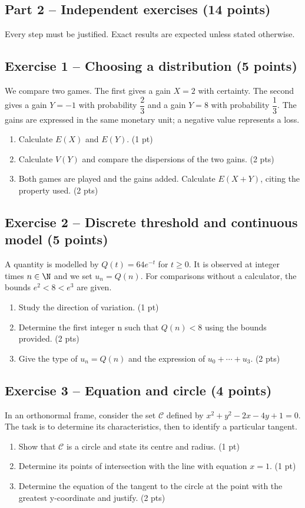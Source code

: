\clearpage\subsection*{Part 2 -- Independent exercises (14 points)}
Every step must be justified. Exact results are expected unless stated otherwise.
\subsection*{Exercise 1 -- Choosing a distribution (5 points)}
We compare two games. The first gives a gain $X=2$ with certainty. The second gives a gain $Y=-1$ with probability $\dfrac23$ and a gain $Y=8$ with probability $\dfrac13$. The gains are expressed in the same monetary unit; a negative value represents a loss.
\begin{enumerate}
\item Calculate $E(X)$ and $E(Y)$. \hfill(1 pt)
\item Calculate $V(Y)$ and compare the dispersions of the two gains. \hfill(2 pts)
\item Both games are played and the gains added. Calculate $E(X+Y)$, citing the property used. \hfill(2 pts)
\end{enumerate}
\subsection*{Exercise 2 -- Discrete threshold and continuous model (5 points)}
A quantity is modelled by $Q(t)=64e^{-t}$ for $t\geq0$. It is observed at integer times $n\in\N$ and we set $u_n=Q(n)$. For comparisons without a calculator, the bounds $e^2<8<e^3$ are given.
\begin{enumerate}
\item Study the direction of variation. \hfill(1 pt)
\item Determine the first integer n such that $Q(n)<8$ using the bounds provided. \hfill(2 pts)
\item Give the type of $u_n=Q(n)$ and the expression of $u_0+\cdots+u_3$. \hfill(2 pts)
\end{enumerate}
\subsection*{Exercise 3 -- Equation and circle (4 points)}
In an orthonormal frame, consider the set $\mathcal C$ defined by $x^2+y^2-2x-4y+1=0$. The task is to determine its characteristics, then to identify a particular tangent.
\begin{enumerate}
\item Show that $\mathcal C$ is a circle and state its centre and radius. \hfill(1 pt)
\item Determine its points of intersection with the line with equation $x=1$. \hfill(1 pt)
\item Determine the equation of the tangent to the circle at the point with the greatest y-coordinate and justify. \hfill(2 pts)
\end{enumerate}
